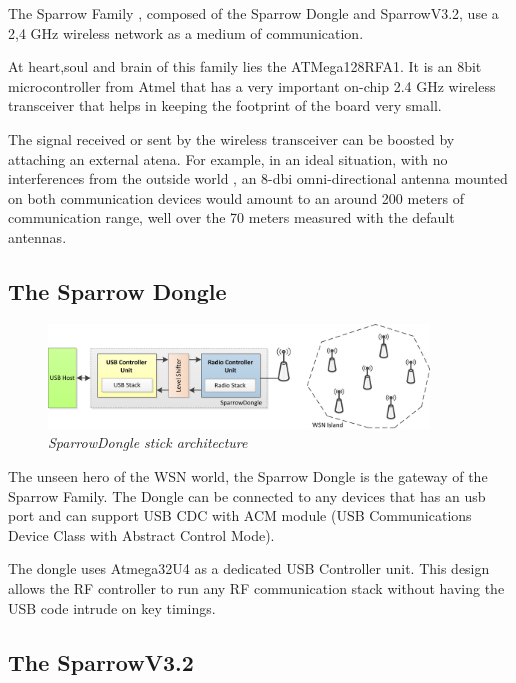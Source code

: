 The Sparrow Family , composed of the Sparrow Dongle and SparrowV3.2, use a 2,4 GHz wireless network as a medium of communication. 

At heart,soul and brain of this family lies the ATMega128RFA1. It is an 8bit microcontroller from Atmel that has a very important on-chip 2.4 GHz wireless transceiver that helps in keeping the footprint of the board very small.

The signal received or sent by the wireless transceiver can be boosted by attaching an external atena. For example, in an ideal situation, with no interferences from the outside world , an 8-dbi omni-directional antenna mounted on both communication devices would amount to an around 200 meters of communication range, well over the 70 meters measured with the default antennas.

\subsection{The Sparrow Dongle}

\begin{figure}[ht]
\begin{center}
\includegraphics[width=0.9\textwidth]{hw_platform/donge_architecture.png}
\end{center}
\caption{\small \itshape{SparrowDongle stick architecture}}
\end{figure}

The unseen hero of the WSN world, the Sparrow Dongle is the gateway of the Sparrow Family. The Dongle can be connected to any devices that has an usb port and can support USB CDC with ACM module (USB Communications Device Class with Abstract Control Mode). 

The dongle uses Atmega32U4 as a dedicated USB Controller unit. This design allows the RF controller to run any RF communication stack without having the USB code intrude on key timings.


\subsection{The SparrowV3.2}

